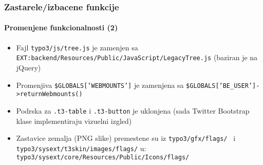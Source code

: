 \begin{frame}[fragile]
	\frametitle{Zastarele/izbacene funkcije}
	\framesubtitle{Promenjene funkcionalnosti (2)}

	\begin{itemize}

		\item Fajl
			\small\texttt{typo3/js/tree.js}\normalsize\space
			je zamenjen sa
			\small\texttt{EXT:backend/Resources/Public/JavaScript/LegacyTree.js}\normalsize\newline
			(baziran je na jQuery)

		\item Promenjiva
			\small\texttt{\$GLOBALS['WEBMOUNTS']}\normalsize\space
			je zamenjena sa
			\small\texttt{\$GLOBALS['BE\_USER']->returnWebmounts()}\normalsize

		\item Podrska za 
			\small\texttt{.t3-table}\normalsize\space
			i
			\small\texttt{.t3-button}\normalsize\space
			je uklonjena\newline
			\small
				(sada Twitter Bootstrap klase implementiraju vizuelni izgled)
			\normalsize

		\item Zastavice zemalja (PNG slike) premestene su iz
			\small\texttt{typo3/gfx/flags/ }\normalsize
			i
			\small\texttt{typo3/sysext/t3skin/images/flags/}\normalsize\newline
			u: \small\texttt{typo3/sysext/core/Resources/Public/Icons/flags/}\normalsize

	\end{itemize}

\end{frame}


